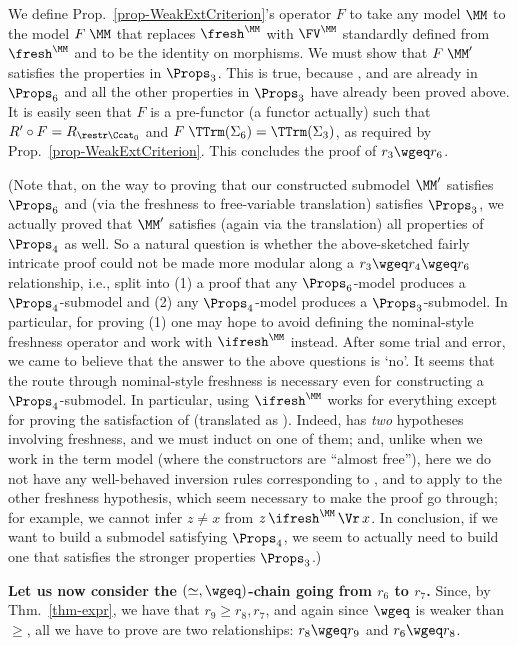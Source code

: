 		We define Prop.~\ref{prop-WeakExtCriterion}'s operator $F$ to take any model $\MM$ to the model $F\;\MM$ that replaces $\fresh^{\MM}$ with $\FV^{\MM}$ standardly defined from $\fresh^{\MM}$ and to be the identity on morphisms. 
		We must show that $F\;\MM'$ satisfies the properties in $\Props_3$. This is true, because \SwVr{}, \SwAp{} and \SwLm{} are already in $\Props_6$ and all the other properties in $\Props_3$ have already been proved above. 
		It is easily seen that $F$ is a pre-functor (a functor actually) such that $R' \circ F = R_{\restr\Ccat_0}$ and 
		$F\;\TTrm(\Sigma_6) = \TTrm(\Sigma_3)$, as required by Prop.~\ref{prop-WeakExtCriterion}. 
		This concludes the proof of $r_3 \wgeq r_6$.%
	
		(Note that, on the way to proving that our constructed submodel $\MM'$ satisfies $\Props_6$
			and (via the freshness to free-variable translation) satisfies $\Props_3$, we actually proved that $\MM'$ satisfies (again via the translation) all properties of $\Props_4$ as well. So a natural question is whether the above-sketched fairly intricate proof could not be made more modular along a $r_3 \wgeq r_4 \wgeq r_6$ relationship, i.e., split into (1) a proof that any $\Props_6$-model produces a $\Props_4$-submodel and (2) any $\Props_4$-model produces a $\Props_3$-submodel. In particular, for proving (1) one may hope to avoid defining the nominal-style freshness operator and work with $\ifresh^{\MM}$ instead. After some trial and error, we came to believe that the answer to the above questions is 
			`no'. It seems that the route through nominal-style freshness is necessary even for constructing a $\Props_4$-submodel. In particular, using 
			$\ifresh^{\MM}$ works for everything except for proving the satisfaction of 
			\SwFr{} (translated as \SwFv{}). Indeed, \SwFv{} has \emph{two} hypotheses involving freshness, and we must induct on one of them; and, unlike when we work in the term model (where the constructors are ``almost free''), here we do not have any well-behaved inversion rules 
			corresponding to \FrVr{}, \FrAp{} and \FrLm{} 
			to apply to the other freshness hypothesis,  which seem necessary to make the proof go through; for example, we cannot infer $z\not= x$ from $z \,\ifresh^{\MM}\, \Vr\,x$.  
			In conclusion, if we want to build a submodel satisfying $\Props_4$, we seem to actually 
			need to build one that satisfies the  stronger properties $\Props_3$.)  
		
		
		\textbf{Let us now consider the $(\simeq,\wgeq)$-chain going from $r_{6}$ to $r_7$.} 
		Since, by Thm.~\ref{thm-expr}, we have that $r_9 \geq r_8,r_7$, 
		and again since $\wgeq$ is weaker than $\geq$, all we have to prove are two relationships: 
		$r_8 \wgeq r_9$ and 
		$r_6 \wgeq r_8$.
		
